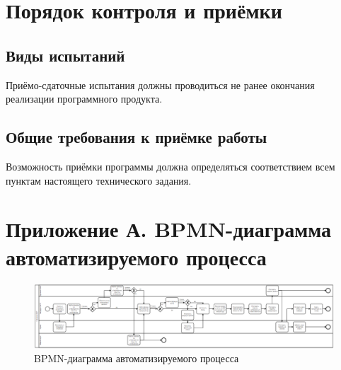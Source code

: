 \documentclass[14pt, a4paper]{extarticle}
\begin{document}
	\section{Порядок контроля и приёмки}
	\subsection{Виды испытаний}
	Приёмо-сдаточные испытания должны проводиться не ранее окончания реализации программного продукта.
	\subsection{Общие требования к приёмке работы}
	Возможность приёмки программы должна определяться соответствием всем пунктам настоящего технического задания.
	
	\newpage
	\section*{Приложение А. BPMN-диаграмма автоматизируемого процесса}
	\begin{figure}[h!]
		\includegraphics[width=\linewidth]{bpmn-diagram.png}
		\caption{BPMN-диаграмма автоматизируемого процесса}
		\label{fig:diagram1}
	\end{figure}
	
\end{document}
